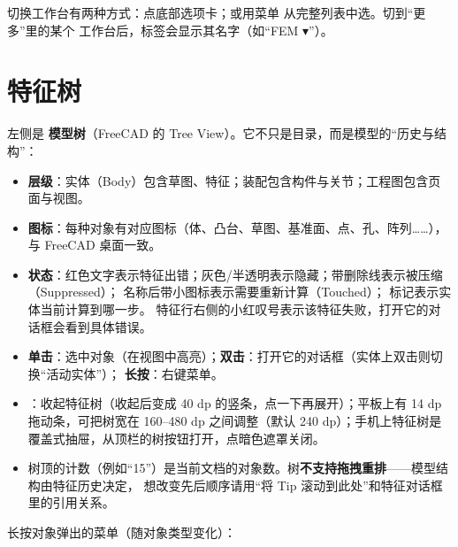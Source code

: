 切换工作台有两种方式：点底部选项卡；或用菜单  从完整列表中选。切到“更多”里的某个
工作台后，标签会显示其名字（如“FEM ▾”）。

\section{特征树}

左侧是 \textbf{模型树}（FreeCAD 的 Tree View）。它不只是目录，而是模型的“历史与结构”：

\begin{itemize}
  \item \textbf{层级}：实体（Body）包含草图、特征；装配包含构件与关节；工程图包含页面与视图。
  \item \textbf{图标}：每种对象有对应图标（体、凸台、草图、基准面、点、孔、阵列……），与 FreeCAD 桌面一致。
  \item \textbf{状态}：红色文字表示特征出错；灰色/半透明表示隐藏；带删除线表示被压缩（Suppressed）；
        名称后带小图标表示需要重新计算（Touched）； 标记表示实体当前计算到哪一步。
      特征行右侧的小红叹号表示该特征失败，打开它的对话框会看到具体错误。
  \item \textbf{单击}：选中对象（在视图中高亮）；\textbf{双击}：打开它的对话框（实体上双击则切换“活动实体”）；
        \textbf{长按}：右键菜单。
  \item {}：收起特征树（收起后变成 40 dp 的竖条，点一下再展开）；平板上有 14 dp 拖动条，可把树宽在
        160--480 dp 之间调整（默认 240 dp）；手机上特征树是覆盖式抽屉，从顶栏的树按钮打开，点暗色遮罩关闭。
  \item 树顶的计数（例如“15”）是当前文档的对象数。树\textbf{不支持拖拽重排}——模型结构由特征历史决定，
        想改变先后顺序请用“将 Tip 滚动到此处”和特征对话框里的引用关系。
\end{itemize}


长按对象弹出的菜单（随对象类型变化）：


